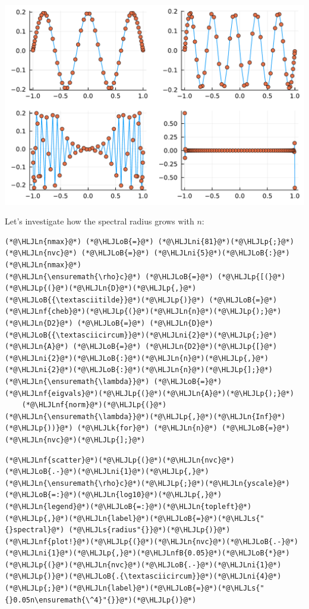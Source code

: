 \documentclass[12pt,a4paper]{article}
\newcommand{\HLJLk}[1]{\textcolor[RGB]{148,91,176}{\textbf{#1}}}
\newcommand{\HLJLn}[1]{#1}
\newcommand{\HLJLnf}[1]{\textcolor[RGB]{66,102,213}{#1}}
\newcommand{\HLJLs}[1]{\textcolor[RGB]{201,61,57}{#1}}
\newcommand{\HLJLnfB}[1]{\textcolor[RGB]{59,151,46}{#1}}
\newcommand{\HLJLni}[1]{\textcolor[RGB]{59,151,46}{#1}}
\newcommand{\HLJLoB}[1]{\textcolor[RGB]{102,102,102}{\textbf{#1}}}
\newcommand{\HLJLp}[1]{#1}
\begin{document}
\includegraphics[width=\linewidth]{jl_Vz6qXN/Chapter5_44_1.pdf}

Let's investigate how the spectral radius grows with $n$:


\begin{lstlisting}
(*@\HLJLn{nmax}@*) (*@\HLJLoB{=}@*) (*@\HLJLni{81}@*)(*@\HLJLp{;}@*) (*@\HLJLn{nvc}@*) (*@\HLJLoB{=}@*) (*@\HLJLni{5}@*)(*@\HLJLoB{:}@*)(*@\HLJLn{nmax}@*)
(*@\HLJLn{\ensuremath{\rho}c}@*) (*@\HLJLoB{=}@*) (*@\HLJLp{[(}@*) (*@\HLJLp{(}@*)(*@\HLJLn{D}@*)(*@\HLJLp{,}@*)(*@\HLJLoB{{\textasciitilde}}@*)(*@\HLJLp{)}@*) (*@\HLJLoB{=}@*) (*@\HLJLnf{cheb}@*)(*@\HLJLp{(}@*)(*@\HLJLn{n}@*)(*@\HLJLp{);}@*) (*@\HLJLn{D2}@*) (*@\HLJLoB{=}@*) (*@\HLJLn{D}@*)(*@\HLJLoB{{\textasciicircum}}@*)(*@\HLJLni{2}@*)(*@\HLJLp{;}@*) (*@\HLJLn{A}@*) (*@\HLJLoB{=}@*) (*@\HLJLn{D2}@*)(*@\HLJLp{[}@*)(*@\HLJLni{2}@*)(*@\HLJLoB{:}@*)(*@\HLJLn{n}@*)(*@\HLJLp{,}@*)(*@\HLJLni{2}@*)(*@\HLJLoB{:}@*)(*@\HLJLn{n}@*)(*@\HLJLp{];}@*) (*@\HLJLn{\ensuremath{\lambda}}@*) (*@\HLJLoB{=}@*) (*@\HLJLnf{eigvals}@*)(*@\HLJLp{(}@*)(*@\HLJLn{A}@*)(*@\HLJLp{);}@*)
    (*@\HLJLnf{norm}@*)(*@\HLJLp{(}@*)(*@\HLJLn{\ensuremath{\lambda}}@*)(*@\HLJLp{,}@*)(*@\HLJLn{Inf}@*)(*@\HLJLp{))}@*) (*@\HLJLk{for}@*) (*@\HLJLn{n}@*) (*@\HLJLoB{=}@*) (*@\HLJLn{nvc}@*)(*@\HLJLp{];}@*)
\end{lstlisting}


\begin{lstlisting}
(*@\HLJLnf{scatter}@*)(*@\HLJLp{(}@*)(*@\HLJLn{nvc}@*)(*@\HLJLoB{.-}@*)(*@\HLJLni{1}@*)(*@\HLJLp{,}@*)(*@\HLJLn{\ensuremath{\rho}c}@*)(*@\HLJLp{;}@*)(*@\HLJLn{yscale}@*)(*@\HLJLoB{=:}@*)(*@\HLJLn{log10}@*)(*@\HLJLp{,}@*)(*@\HLJLn{legend}@*)(*@\HLJLoB{=:}@*)(*@\HLJLn{topleft}@*)(*@\HLJLp{,}@*)(*@\HLJLn{label}@*)(*@\HLJLoB{=}@*)(*@\HLJLs{"{}spectral}@*) (*@\HLJLs{radius"{}}@*)(*@\HLJLp{)}@*)
(*@\HLJLnf{plot!}@*)(*@\HLJLp{(}@*)(*@\HLJLn{nvc}@*)(*@\HLJLoB{.-}@*)(*@\HLJLni{1}@*)(*@\HLJLp{,}@*)(*@\HLJLnfB{0.05}@*)(*@\HLJLoB{*}@*)(*@\HLJLp{(}@*)(*@\HLJLn{nvc}@*)(*@\HLJLoB{.-}@*)(*@\HLJLni{1}@*)(*@\HLJLp{)}@*)(*@\HLJLoB{.{\textasciicircum}}@*)(*@\HLJLni{4}@*)(*@\HLJLp{;}@*)(*@\HLJLn{label}@*)(*@\HLJLoB{=}@*)(*@\HLJLs{"{}0.05n\ensuremath{\^4}"{}}@*)(*@\HLJLp{)}@*)
\end{lstlisting}
\end{document}

